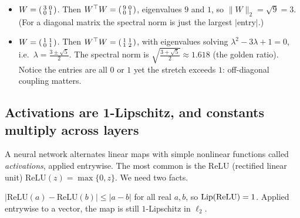 \begin{example}\leavevmode
\begin{itemize}[nosep]
  \item $W=\begin{psmallmatrix}3&0\\0&1\end{psmallmatrix}$. Then $W^\top W=\begin{psmallmatrix}9&0\\0&1\end{psmallmatrix}$, eigenvalues $9$ and $1$, so $\|W\|_2=\sqrt9=3$. (For a diagonal matrix the spectral norm is just the largest $|$entry$|$.)
  \item $W=\begin{psmallmatrix}1&1\\0&1\end{psmallmatrix}$. Then $W^\top W=\begin{psmallmatrix}1&1\\1&2\end{psmallmatrix}$, with eigenvalues solving $\lambda^2-3\lambda+1=0$, i.e.\ $\lambda=\tfrac{3\pm\sqrt5}{2}$. The spectral norm is $\sqrt{\tfrac{3+\sqrt5}{2}}\approx1.618$ (the golden ratio). Notice the entries are all $0$ or $1$ yet the stretch exceeds $1$: off-diagonal coupling matters.
\end{itemize}
\end{example}

\subsection{Activations are 1-Lipschitz, and constants multiply across layers}
\label{sub:composition}

A neural network alternates linear maps with simple nonlinear functions called \emph{activations}, applied entrywise. The most common is the ReLU (rectified linear unit) $\mathrm{ReLU}(z)=\max\{0,z\}$. We need two facts.

\begin{lemma}
\label{lem:relu}
$|\mathrm{ReLU}(a)-\mathrm{ReLU}(b)|\le|a-b|$ for all real $a,b$, so $\operatorname{Lip}(\mathrm{ReLU})=1$. Applied entrywise to a vector, the map is still $1$-Lipschitz in $\ell_2$.
\end{lemma}

